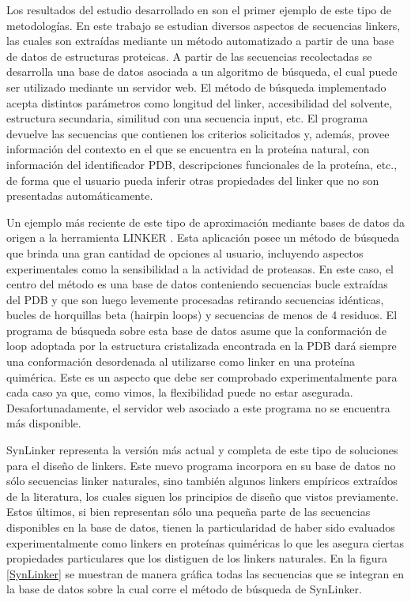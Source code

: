 Los resultados del estudio desarrollado en \cite{george2002analysis} son el primer ejemplo de este tipo de metodologías.
En este trabajo se estudian diversos aspectos de secuencias linkers, las cuales son extraídas mediante un método automatizado a partir de una base de datos de estructuras proteicas. 
A partir de las secuencias recolectadas se desarrolla una base de datos asociada a un algoritmo de búsqueda, el cual puede ser utilizado mediante un servidor web\cite{linkerdbIBIVU}.
El método de búsqueda implementado acepta distintos parámetros como longitud del linker, accesibilidad del solvente, estructura secundaria, similitud con una secuencia input, etc.
El programa devuelve las secuencias que contienen los criterios solicitados y, además, provee información del contexto en el que se encuentra en la proteína natural, con información del identificador PDB, 
descripciones funcionales de la proteína, etc., de forma que el usuario pueda inferir otras propiedades del linker que no son presentadas automáticamente.


Un ejemplo más reciente de este tipo de aproximación mediante bases de datos da origen a la herramienta LINKER \cite{crasto2000linker,xue2004linker}.
Esta aplicación posee un método de búsqueda que brinda una gran cantidad de opciones al usuario, incluyendo aspectos experimentales como la sensibilidad a la actividad de proteasas.
En este caso, el centro del método es una base de datos conteniendo secuencias bucle extraídas del PDB y que son luego levemente procesadas retirando secuencias idénticas, bucles de horquillas beta (hairpin loops) y secuencias de menos de 4 residuos. 
El programa de búsqueda sobre esta base de datos asume que la conformación de loop adoptada por la estructura cristalizada encontrada en la PDB dará siempre una conformación desordenada al utilizarse como linker en una proteína quimérica.
Este es un aspecto que debe ser comprobado experimentalmente para cada caso ya que, como vimos, la flexibilidad puede no estar asegurada.
Desafortunadamente, el servidor web asociado a este programa no se encuentra más disponible.


SynLinker\cite{liu2015synlinker} representa la versión más actual y completa de este tipo de soluciones para el diseño de linkers. 
Este nuevo programa incorpora en su base de datos no sólo secuencias linker naturales, sino también algunos linkers empíricos extraídos de la literatura, 
los cuales siguen los principios de diseño que vistos previamente. Estos últimos, si bien representan sólo una pequeña parte de las secuencias disponibles en la base de datos, 
tienen la particularidad de haber sido evaluados experimentalmente como linkers en proteínas quiméricas lo que les asegura ciertas propiedades particulares que los distiguen de los linkers naturales.
En la figura \ref{SynLinker} se muestran de manera gráfica todas las secuencias que se integran en la base de datos sobre la cual corre el método de búsqueda de SynLinker.

